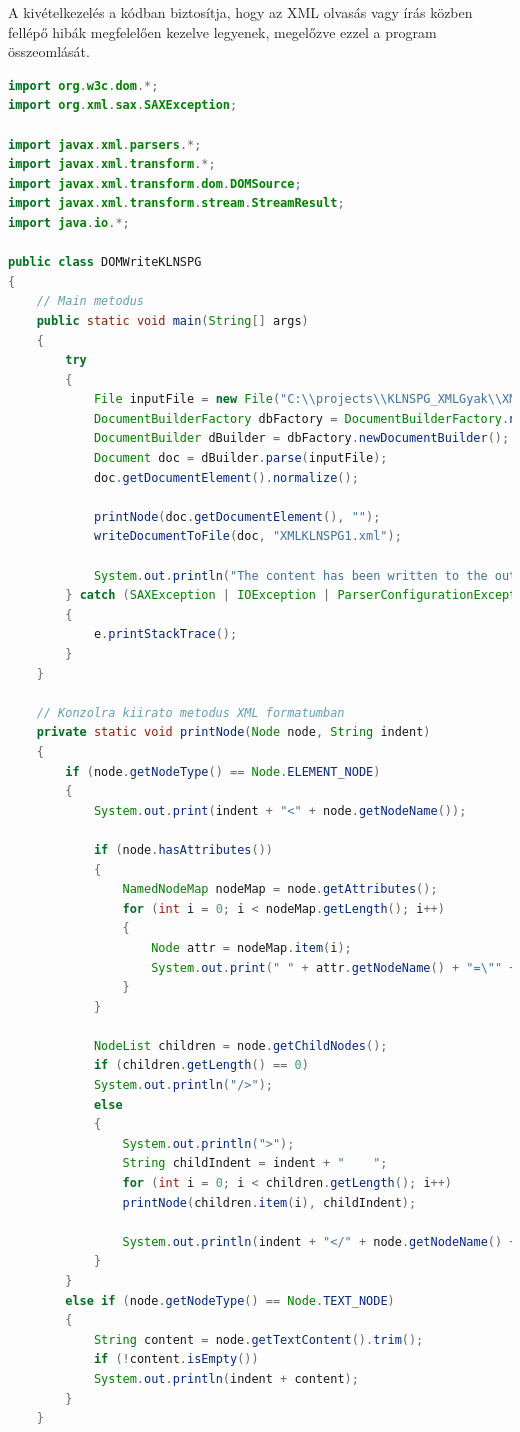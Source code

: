 \documentclass[12pt]{report}
\begin{document}
A kivételkezelés a kódban biztosítja, hogy az XML olvasás vagy írás közben fellépő hibák megfelelően kezelve legyenek, megelőzve ezzel a program összeomlását.\\

\begin{lstlisting}[caption={DOMWriteKLNSPG.java} adatíró program, language=Java]
import org.w3c.dom.*;
import org.xml.sax.SAXException;

import javax.xml.parsers.*;
import javax.xml.transform.*;
import javax.xml.transform.dom.DOMSource;
import javax.xml.transform.stream.StreamResult;
import java.io.*;

public class DOMWriteKLNSPG
{
	// Main metodus
	public static void main(String[] args)
	{
		try 
		{
			File inputFile = new File("C:\\projects\\KLNSPG_XMLGyak\\XMLTaskKLNSPG\\XMLKLNSPG.xml");
			DocumentBuilderFactory dbFactory = DocumentBuilderFactory.newInstance();
			DocumentBuilder dBuilder = dbFactory.newDocumentBuilder();
			Document doc = dBuilder.parse(inputFile);
			doc.getDocumentElement().normalize();
			
			printNode(doc.getDocumentElement(), "");
			writeDocumentToFile(doc, "XMLKLNSPG1.xml");
			
			System.out.println("The content has been written to the output file successfully.");
		} catch (SAXException | IOException | ParserConfigurationException | TransformerException e) 
		{
			e.printStackTrace();
		}
	}
	
	// Konzolra kiirato metodus XML formatumban
	private static void printNode(Node node, String indent) 
	{
		if (node.getNodeType() == Node.ELEMENT_NODE) 
		{
			System.out.print(indent + "<" + node.getNodeName());
			
			if (node.hasAttributes()) 
			{
				NamedNodeMap nodeMap = node.getAttributes();
				for (int i = 0; i < nodeMap.getLength(); i++) 
				{
					Node attr = nodeMap.item(i);
					System.out.print(" " + attr.getNodeName() + "=\"" + attr.getNodeValue() + "\"");
				}
			}
			
			NodeList children = node.getChildNodes();
			if (children.getLength() == 0)
			System.out.println("/>");
			else 
			{
				System.out.println(">");
				String childIndent = indent + "    ";
				for (int i = 0; i < children.getLength(); i++)
				printNode(children.item(i), childIndent);
				
				System.out.println(indent + "</" + node.getNodeName() + ">");
			}
		} 
		else if (node.getNodeType() == Node.TEXT_NODE) 
		{
			String content = node.getTextContent().trim();
			if (!content.isEmpty())
			System.out.println(indent + content);
		}
	}    
	

\end{lstlisting}
\end{document}
